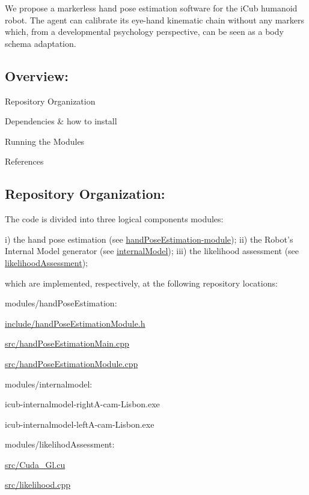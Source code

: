 We propose a markerless hand pose estimation software for the i\+Cub humanoid robot. The agent can calibrate its eye-\/hand kinematic chain without any markers which, from a developmental psychology perspective, can be seen as a body schema adaptation.

\subsection*{Overview\+:}


\begin{DoxyItemize}
\item Repository Organization
\item Dependencies \& how to install
\item Running the Modules
\item References
\end{DoxyItemize}

\subsection*{Repository Organization\+:}

The code is divided into three logical components modules\+:

i) the hand pose estimation (see \hyperlink{group__handPoseEstimation-module}{hand\+Pose\+Estimation-\/module}); ii) the Robot’s Internal Model generator (see \hyperlink{group__internalModel}{internal\+Model}); iii) the likelihood assessment (see \hyperlink{group__likelihoodAssessment}{likelihood\+Assessment});

which are implemented, respectively, at the following repository locations\+:
\begin{DoxyItemize}
\item modules/hand\+Pose\+Estimation\+:
\begin{DoxyItemize}
\item \hyperlink{handPoseEstimationModule_8h}{include/hand\+Pose\+Estimation\+Module.\+h}
\item \hyperlink{handPoseEstimationMain_8cpp}{src/hand\+Pose\+Estimation\+Main.\+cpp}
\item \hyperlink{handPoseEstimationModule_8cpp}{src/hand\+Pose\+Estimation\+Module.\+cpp}
\end{DoxyItemize}
\item modules/internalmodel\+:
\begin{DoxyItemize}
\item icub-\/internalmodel-\/right\+A-\/cam-\/\+Lisbon.\+exe
\item icub-\/internalmodel-\/left\+A-\/cam-\/\+Lisbon.\+exe
\end{DoxyItemize}
\item modules/likelihod\+Assessment\+:
\begin{DoxyItemize}
\item \hyperlink{Cuda__Gl_8cu_source}{src/\+Cuda\+\_\+\+Gl.\+cu}
\item \hyperlink{likelihood_8cpp}{src/likelihood.\+cpp}
\end{DoxyItemize}
\end{DoxyItemize}

